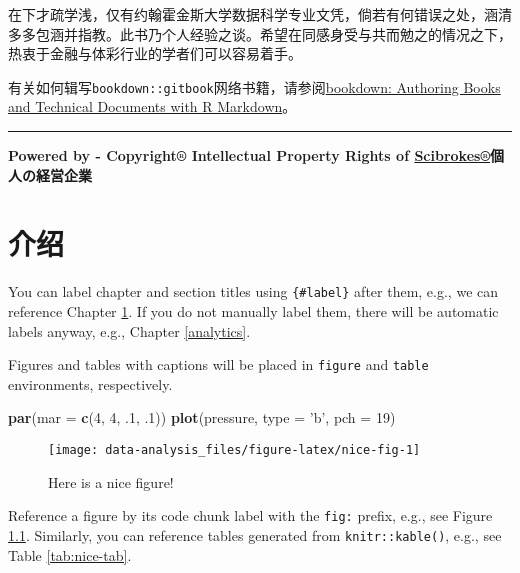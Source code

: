 \documentclass[]{book}
\newenvironment{Shaded}{\begin{snugshade}}{\end{snugshade}}
\newcommand{\KeywordTok}[1]{\textcolor[rgb]{0.13,0.29,0.53}{\textbf{#1}}}
\newcommand{\DataTypeTok}[1]{\textcolor[rgb]{0.13,0.29,0.53}{#1}}
\newcommand{\DecValTok}[1]{\textcolor[rgb]{0.00,0.00,0.81}{#1}}
\newcommand{\StringTok}[1]{\textcolor[rgb]{0.31,0.60,0.02}{#1}}
\newcommand{\NormalTok}[1]{#1}
\theoremstyle{definition}
\theoremstyle{definition}
\theoremstyle{definition}
\theoremstyle{remark}
\begin{document}
在下才疏学浅，仅有约翰霍金斯大学数据科学专业文凭，倘若有何错误之处，涵清多多包涵并指教。此书乃个人经验之谈。希望在同感身受与共而勉之的情况之下，热衷于金融与体彩行业的学者们可以容易着手。

有关如何辑写\texttt{bookdown::gitbook}网络书籍，请参阅\href{https://bookdown.org/yihui/bookdown/}{bookdown:
Authoring Books and Technical Documents with R Markdown}。

\begin{center}\rule{0.5\linewidth}{\linethickness}\end{center}

\textbf{Powered by - Copyright® Intellectual Property Rights of
\href{http://www.scibrokes.com}{Scibrokes®}個人の経営企業}

\chapter{介绍}\label{intro}

You can label chapter and section titles using \texttt{\{\#label\}}
after them, e.g., we can reference Chapter \ref{intro}. If you do not
manually label them, there will be automatic labels anyway, e.g.,
Chapter \ref{analytics}.

Figures and tables with captions will be placed in \texttt{figure} and
\texttt{table} environments, respectively.

\begin{Shaded}
\begin{Highlighting}[]
\KeywordTok{par}\NormalTok{(}\DataTypeTok{mar =} \KeywordTok{c}\NormalTok{(}\DecValTok{4}\NormalTok{, }\DecValTok{4}\NormalTok{, .}\DecValTok{1}\NormalTok{, .}\DecValTok{1}\NormalTok{))}
\KeywordTok{plot}\NormalTok{(pressure, }\DataTypeTok{type =} \StringTok{'b'}\NormalTok{, }\DataTypeTok{pch =} \DecValTok{19}\NormalTok{)}
\end{Highlighting}
\end{Shaded}

\begin{figure}

{\centering \texttt{[image: data-analysis\_files/figure-latex/nice-fig-1]} 

}

\caption{Here is a nice figure!}\label{fig:nice-fig}
\end{figure}

Reference a figure by its code chunk label with the \texttt{fig:}
prefix, e.g., see Figure \ref{fig:nice-fig}. Similarly, you can
reference tables generated from \texttt{knitr::kable()}, e.g., see Table
\ref{tab:nice-tab}.
\end{document}
